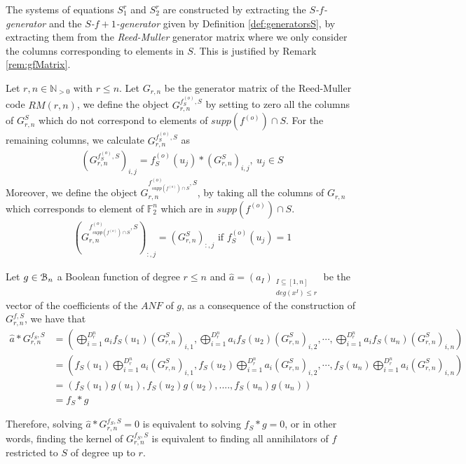 \documentclass[11pt]{llncs}
\begin{document}
The systems of equations $S_1^r$ and $S_2^r$ are constructed by extracting the \textit{$S$-$f$-generator} and the \textit{$S$-$f+1$-generator} given by Definition \ref{def:generatorsS}, by extracting them from the \textit{Reed-Muller} generator matrix where we only consider the columns corresponding to elements in $S$. This is justified by Remark \ref{rem:gfMatrix}.



\begin{definition}\label{def:generatorsS}
Let $r,n\in\mathbb{N}_{>0}$ with $r\leq n$. Let $G_{r,n}$ be the generator matrix of the Reed-Muller code $RM(r,n)$, we define the object $G_{r,n}^{f^{(o)}_S,S}$ by setting to zero all the columns of $G_{r,n}^S$ which do not correspond to elements of $supp(f^{(o)} )\cap S$. For the remaining columns, we calculate $G_{r,n}^{f_S^{(o)},S}$ as
	\begin{align*}
	\left(G_{r,n}^{f^{(o)}_S,S}\right)_{i,j} = f_S^{(o)}(u_j)*\left(G_{r,n}^S\right)_{i,j}, \ u_j \in S
	\end{align*}
	Moreover, we define the object $G_{r,n}^{f^{(o)}_{supp\left(f^{(o)}\right) \cap S},S}$, by taking all the columns of $G_{r,n}$ which corresponds to element of $\mathbb{F}_2^n$ which are in $supp\left(f^{(o)}\right) \cap S$.
	\begin{align}
	\left(G_{r,n}^{f_{supp\left(f^{(o)}\right) \cap S}^{(o)},S}\right)_{:,j} = (G_{r,n}^S)_{:,j} \mbox{ if } f_S^{(o)}(u_j) = 1 \label{eq:f-generatorRestrictedSet}
	\end{align}
\end{definition}

\begin{remark}\label{rem:gfMatrix}
	Let $g \in \mathcal{B}_{n}$ a Boolean function of degree $r\leq n$ and $\hat{a} = \left(a_I\right)_{\substack{I \subseteq [1,n] \\ deg\left(x^I\right) \leq r}}$ be the vector of the coefficients of the $ANF$ of $g$, as a consequence of the construction of $G_{r,n}^{f,S}$, we have that
	\begin{equation}
	\begin{aligned}
	\hat{a} * G_{r,n}^{f_S,S} & = \left(\bigoplus_{i=1}^{D_r^n}a_i f_S(u_1)(G_{r,n}^S)_{i,1}, \bigoplus_{i=1}^{D_r^n}a_i f_S(u_2)(G_{r,n}^S)_{i,2}, \cdots, \bigoplus_{i=1}^{D_r^n}a_i f_S(u_n)(G_{r,n}^S)_{i,n}\right)     \\
	& =  \left(f_S(u_1) \bigoplus_{i=1}^{D_r^n}a_i (G_{r,n}^S)_{i,1}, f_S(u_2) \bigoplus_{i=1}^{D_r^n}a_i (G_{r,n}^S)_{i,2}, \cdots, f_S(u_n) \bigoplus_{i=1}^{D_r^n}a_i (G_{r,n}^S)_{i,n}\right) \\
	& = \left(f_S(u_1) g(u_1), f_S(u_2) g(u_2), ...., f_S(u_n) g(u_n)\right)                                                                                      \\
	& = f_S*g
	\end{aligned}
	\end{equation}
	
	Therefore, solving $ \hat{a} * G_{r,n}^{f_S,S} = 0$ is equivalent to solving $f_S*g = 0$, or in other words, finding the kernel of $G_{r,n}^{f_S,S}$ is equivalent to finding all annihilators of $f$ restricted to $S$ of degree up to $r$.
\end{remark}
\end{document}
